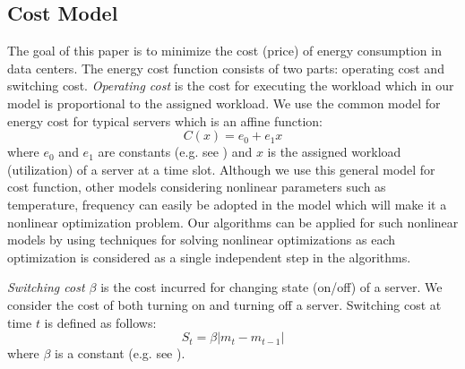 \documentclass[10pt,conference,compsocconf,letterpaper]{IEEEtran}
\begin{document}
\subsection{Cost Model}
The goal of this paper is to minimize the cost (price) of energy consumption in data centers. The energy cost function consists of two parts: operating cost and switching cost. {\it Operating cost} is the cost for executing the workload which in our model is proportional to the assigned workload. We use the common model for energy cost for typical servers which is an affine function:
$$C(x)=e_0+e_1x$$
where $e_0$ and $e_1$ are constants (e.g. see \cite{20}) and $x$ is the assigned workload (utilization) of a server at a time slot. Although we use this general model for cost function, other models considering nonlinear parameters such as temperature, frequency can easily be adopted in the model which will make it a nonlinear optimization problem. Our algorithms can be applied for such nonlinear models by using techniques for solving nonlinear optimizations as each optimization is considered as a single independent step in the algorithms.





{\it Switching cost $\beta$} is the cost incurred for changing state (on/off) of a server. We consider the cost of both turning on and turning off a server. Switching cost at time $t$ is defined as follows: $$S_t = \beta |m_t-m_{t-1}|$$ where $\beta$ is a constant (e.g. see \cite{9,21}).
\end{document}
